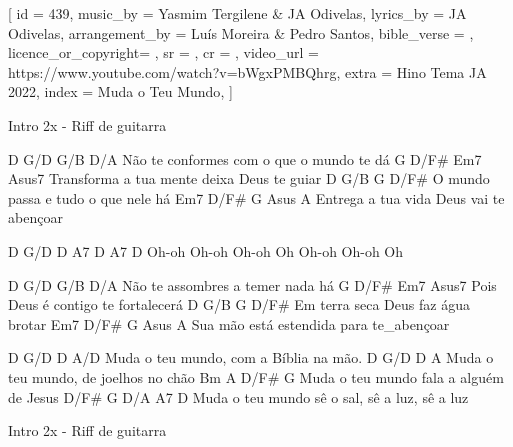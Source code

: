 [
    id                  = {439},
    music_by            = {Yasmim Tergilene & JA Odivelas}, %
    lyrics_by           = {JA Odivelas}, %
    arrangement_by      = {Luís Moreira & Pedro Santos}, %
    bible_verse         = {},
    licence_or_copyright= {},
    sr                  = {},
    cr                  = {},
    video_url           = {https://www.youtube.com/watch?v=bWgxPMBQhrg}, %
    extra               = {Hino Tema JA 2022},
    index               = {Muda o Teu Mundo},
]

\beginverse
Intro 2x - Riff de guitarra
\endverse

\beginverse
D         G/D                G/B      D/A	
Não te conformes com o que o mundo te dá
     G           D/F#        Em7        Asus7
Transforma a tua mente deixa Deus te guiar
D       G/B            G        D/F#
O mundo passa e tudo o que nele há
  Em7         D/F#          G        Asus A
Entrega a tua vida Deus vai te abençoar

D     G/D   D     A7   D     A7    D
Oh-oh Oh-oh Oh-oh Oh   Oh-oh Oh-oh Oh

\endverse

\beginverse
D       G/D          G/B      D/A
Não te assombres a temer nada há
     G         D/F#       Em7   Asus7
Pois Deus é contigo te fortalecerá
D        G/B           G       D/F#
Em terra seca Deus faz água brotar
    Em7           D/F#         G     Asus A
Sua mão está estendida para te_abençoar

\endverse

\beginchorus
D          G/D          D         A/D
Muda o teu mundo, com a Bíblia na mão.
D          G/D         D        A
Muda o teu mundo, de joelhos no chão
Bm         A             D/F#       G
Muda o teu mundo fala a alguém de Jesus
D/F#       G          D/A       A7        D
Muda o teu mundo sê o sal, sê a luz, sê a luz

\endchorus

\beginverse
Intro 2x - Riff de guitarra
\endverse

